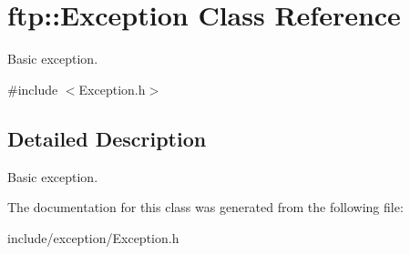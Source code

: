 \hypertarget{classftp_1_1_exception}{\section{ftp\-:\-:Exception Class Reference}
\label{classftp_1_1_exception}
}


Basic exception.  




{\ttfamily \#include $<$Exception.\-h$>$}



\subsection{Detailed Description}
Basic exception. 

The documentation for this class was generated from the following file\-:\begin{DoxyCompactItemize}
\item 
include/exception/Exception.\-h\end{DoxyCompactItemize}
